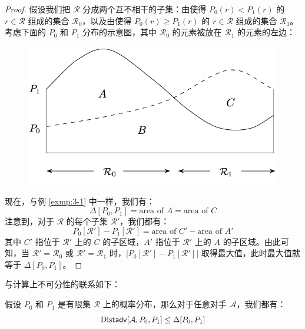 \begin{proof}
假设我们把 $\mathcal{R}$ 分成两个互不相干的子集：由使得 $P_0(r)<P_1(r)$ 的 $r\in\mathcal R$ 组成的集合 $\mathcal{R}_0$，以及由使得 $P_0(r)\geq P_1(r)$ 的 $r\in\mathcal R$ 组成的集合 $\mathcal{R}_1$。考虑下面的 $P_0$ 和 $P_1$ 分布的示意图，其中 $\mathcal{R}_0$ 的元素被放在 $\mathcal{R}_1$ 的元素的左边：

\begin{figure}[h!]
  \centering
  \includegraphics[width=0.45\linewidth]{figures/chapter3/fig-vac2.png}
\end{figure}

现在，与例 \ref{exmp:3-1} 中一样，我们有：
\[
\Delta[P_0,P_1]=\text{area of } A = \text{area of } C
\]
注意到，对于 $\mathcal{R}$ 的每个子集 $\mathcal{R}'$，我们都有：
\[
P_0[\mathcal{R}']-P_1[\mathcal{R}']=\text{area of } C' - \text{area of } A'
\]
其中 $C'$ 指位于 $\mathcal{R}'$ 上的 $C$ 的子区域，$A'$ 指位于 $\mathcal{R}'$ 上的 $A$ 的子区域。由此可知，当 $\mathcal{R}'=\mathcal{R}_0$ 或 $\mathcal{R}'=\mathcal{R}_1$ 时，$|P_0[\mathcal{R}']-P_1[\mathcal{R}']|$ 取得最大值，此时最大值就等于 $\Delta[P_0,P_1]$。
\end{proof}

与计算上不可分性的联系如下：

\begin{theorem}\label{theo:3-11}
假设 $P_0$ 和 $P_1$ 是有限集 $\mathcal{R}$ 上的概率分布，那么对于任意对手 $\mathcal A$，我们都有：
\[
{\rm Dist\mathsf{adv}}[\mathcal{A},P_0,P_1]\leq\Delta[P_0,P_1]
\]
\end{theorem}

